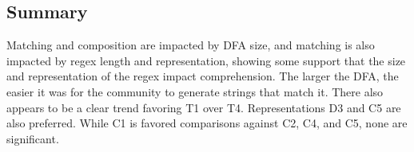 \subsection{Summary}
Matching and composition are impacted by DFA size, and matching is also impacted by regex length and representation, showing some support that the size and representation of the regex impact comprehension.
The larger the DFA, the easier it was for the community to generate strings that match it. 
There also appears to be a clear trend favoring T1 over T4. Representations D3 and C5 are also preferred. While C1 is favored  comparisons against C2, C4, and C5, none are significant. 



